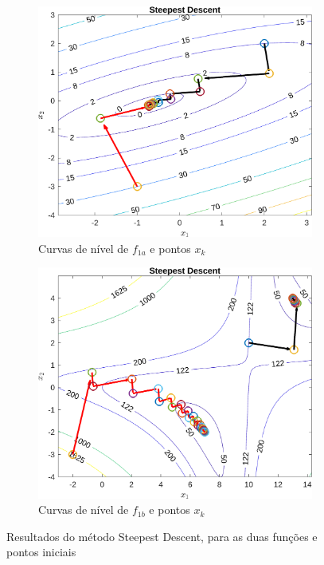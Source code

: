 \documentclass[10pt, a4paper]{article}
\begin{document}
\begin{figure}[H]
      \centering
      \begin{subfigure}{0.45\textwidth}
            \includegraphics[width=\textwidth]{img01A_m03.png}
            \caption{Curvas de n\'ivel de $f_{1a}$ e pontos $x_{k}$}
            \label{fig:graf01A_m03}
      \end{subfigure}
      \begin{subfigure}{0.45\textwidth}
            \centering
            \includegraphics[width=\textwidth]{img01B_m03.png}
            \caption{Curvas de n\'ivel de $f_{1b}$ e pontos $x_{k}$}
            \label{fig:graf01B_m03}
      \end{subfigure}
      \caption{Resultados do m\'etodo Steepest Descent, para as duas fun\c c\~oes e pontos iniciais}
      \label{fig:graf01_m03}
\end{figure}
\end{document}
